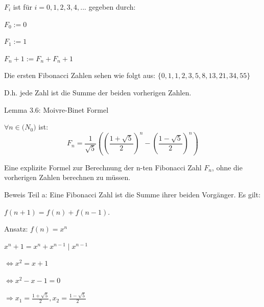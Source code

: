 \documentclass[10pt]{beamer}
\begin{document}
\begin{frame}

 $F_i$ ist für $i= 0,1,2,3,4,...$ gegeben durch: 

\vspace{0.2cm}

$F_0:= 0$

$F_1:= 1$

$F_n+1:= F_n + F_n+1$

\vspace{0.2cm}

\noindent Die ersten Fibonacci Zahlen sehen wie folgt aus: $\{0,1,1,2,3,5,8,13,21,34,55\}\ $

\noindent D.h. jede Zahl ist die Summe der beiden vorherigen Zahlen.
    
\end{frame}

\begin{frame}{Lemma 3.6: Moivre-Binet Formel}

$\forall n \in \mathbf (N_0)$ ist: \[ F_n = \frac{1}{\sqrt{5}} \left( \left(\frac{1+\sqrt{5}}{2}\right)^n - \left(\frac{1-\sqrt{5}}{2}\right)^n \right) \] 


\noindent Eine explizite Formel zur Berechnung der n-ten Fibonacci Zahl $F_n$, ohne die vorherigen Zahlen berechnen zu müssen.

    
\end{frame}

\begin{frame}{Beweis Teil a:}
Eine Fibonacci Zahl ist die Summe ihrer beiden Vorgänger. Es gilt:

\vspace{0.2cm}
 $f(n+1)= f(n) + f(n-1)$.

 
\vspace{0.3cm}
\noindent Ansatz: $ f(n) = x^n $


\vspace{0.2cm}
$x^n+1 = x^n + x^{n-1}    \mid x^{n-1}$

$\Leftrightarrow x^2 = x+1 $

 $\Leftrightarrow x^2 -x- 1 = 0$ 
\vspace{0.15cm}


$ \Rightarrow x_1 = \frac{1 + \sqrt{5}}{2} ,  x_2= \frac{1 - \sqrt{5}}{2}$

    
\end{frame}
\end{document}
